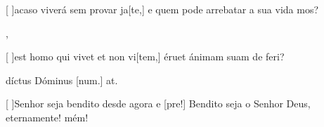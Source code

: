 {    {\item {}[ ]{a}caso viverá sem provar ja[te,] e quem pode arrebatar a sua vida mos?},
  {\item {}[ ]{est} homo qui vivet et non vi[tem,] éruet ánimam suam de feri?
      \item {}díctus Dóminus [num.] at.}%
    {\item {}[ ]{Se}nhor seja bendito desde agora e [pre!] Bendito seja o Senhor Deus, eternamente! mém!}
}
